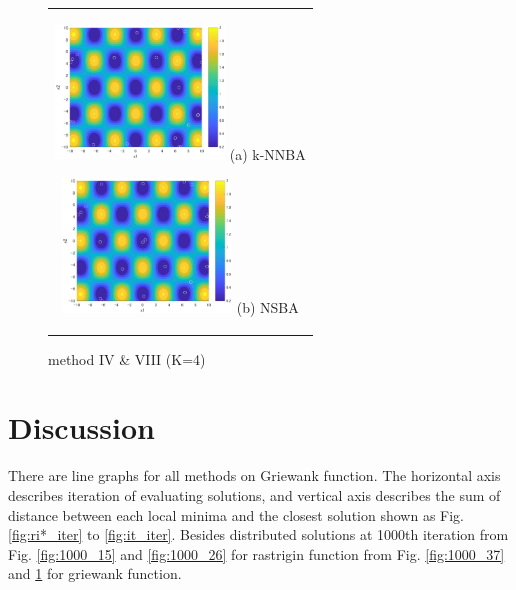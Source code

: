 \documentclass{ies2018}
\begin{document}
\begin{figure}[p]
\begin{center}
\begin{tabular}{c}
\begin{minipage}{0.5\hsize}
  \begin{center}
   \includegraphics[width=45mm]{eps/iv_k=4_1000.eps}
   \hspace{1.0cm} (a) k-NNBA
  \end{center}
  \label{fig:k=4_iv}
 \end{minipage}

 \begin{minipage}{0.5\hsize}
  \begin{center}
   \includegraphics[width=45mm]{eps/viii_k=4_1000.eps}
   \hspace{1.0cm} (b) NSBA
  \end{center}
  \label{fig:k=4_viii}
 \end{minipage}
\end{tabular}
\end{center}
\caption{method IV \& VIII (K=4)}
\label{fig:1000_48}
\end{figure}


\section{Discussion}
There are line graphs for all methods on Griewank function. The horizontal axis describes iteration of evaluating solutions, and vertical axis describes the sum of distance between each local minima and the closest solution shown as Fig. \ref{fig:ri*_iter} to \ref{fig:it_iter}. Besides distributed solutions at 1000th iteration from Fig. \ref{fig:1000_15} and \ref{fig:1000_26} for rastrigin function from Fig. \ref{fig:1000_37} and \ref{fig:1000_48} for griewank function. 
\end{document}
